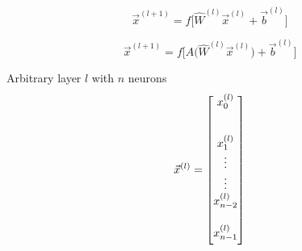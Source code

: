 \documentclass[12pt,letterpaper]{article}
\begin{document}
\vspace{3cm}
\begin{equation}
\label{Standard Feed Forward}
\vec{x}^{(l+1)} = f  \Big[ \hat{W}^{(l)}\vec{x}^{(l)} + \vec{b}^{(l)} \Big]
\end{equation}

\vspace{1.5cm}

\begin{equation}
\label{Attack Feed Forward}
\vec{x}^{(l+1)} = f  \Big[ A\big(\hat{W}^{(l)}\vec{x}^{(l)}\big) + \vec{b}^{(l)} \Big]
\end{equation}

\vspace{3cm}

Arbitrary layer $l$ with $n$ neurons
\begin{equation}
\label{layer l}
\vec{x}^{(l)} = 
\begin{bmatrix}
\vspace{0.3cm}
x^{(l)}_{0} \vspace{0.5cm} \\ 
x^{(l)}_{1} \\ 
\vdots \\ \vdots \\ 
x^{(l)}_{n-2} \vspace{0.5cm} \\ 
x^{(l)}_{n-1} \vspace{0.2cm}
\end{bmatrix}
\end{equation}
\end{document}
